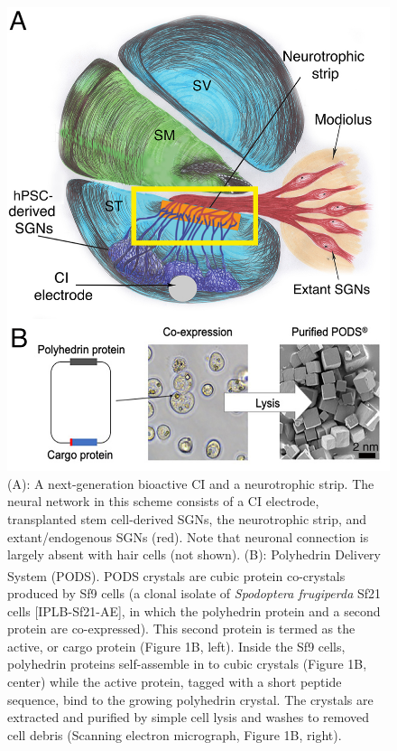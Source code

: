 \documentclass[review]{elsarticle}
\begin{document}
\begin{figure}
	\begin{center}
		\includegraphics[width=\textwidth]{Fig_1.jpg}
	\end{center}
	\caption{
		(A): A next-generation bioactive CI and a neurotrophic strip.  The neural network in this scheme consists of a CI electrode, transplanted stem cell-derived SGNs, the neurotrophic strip, and extant/endogenous SGNs (red). Note that neuronal connection is largely absent with hair cells (not shown). (B): Polyhedrin Delivery System (PODS)\textsuperscript{\textregistered}. PODS\textsuperscript{\textregistered} crystals are cubic protein co-crystals produced by Sf9 cells (a clonal isolate of \textit{Spodoptera frugiperda} Sf21 cells [IPLB-Sf21-AE], in which the polyhedrin protein and a second protein are co-expressed). This second protein is termed as the active, or cargo protein (Figure 1B, left). Inside the Sf9 cells, polyhedrin proteins self-assemble in to cubic crystals (Figure 1B, center) while the active protein, tagged with a short peptide sequence, bind to the growing polyhedrin crystal. The crystals are extracted and purified by simple cell lysis and washes to removed cell debris (Scanning electron micrograph, Figure 1B, right).
	}
\end{figure}
\end{document}
